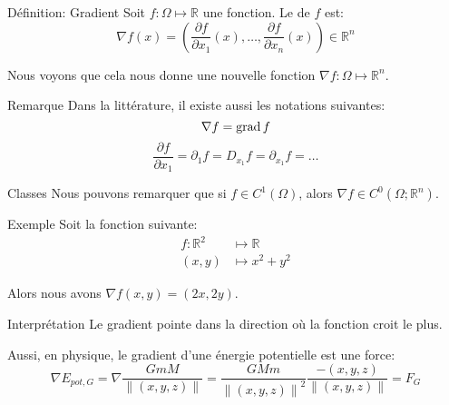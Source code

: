\documentclass[a4paper]{article}
\begin{document}
\begin{parag}{Définition: Gradient}
    Soit $f: \Omega \mapsto \mathbb{R}$ une fonction. Le  de $f$ est: 
    \[\nabla f\left(x\right) = \left(\frac{\partial f}{\partial x_1} \left(x\right), \ldots, \frac{\partial f}{\partial x_n} \left(x\right)\right) \in \mathbb{R}^n\]

    Nous voyons que cela nous donne une nouvelle fonction $\nabla f : \Omega \mapsto \mathbb{R}^n$.

    \begin{subparag}{Remarque}
        Dans la littérature, il existe aussi les notations suivantes: 
        \[\nabla f = \operatorname{grad} f\] 
        \[\frac{\partial f}{\partial x_1} = \partial_1 f = D_{x_1} f = \partial_{x_1} f = \ldots\]
    \end{subparag}

    \begin{subparag}{Classes}
        Nous pouvons remarquer que si $f \in C^1\left(\Omega\right)$, alors $\nabla f \in C^0\left(\Omega; \mathbb{R}^n\right)$.
    \end{subparag}

    \begin{subparag}{Exemple}
        Soit la fonction suivante: 
        \[\begin{split}
        f: \mathbb{R}^2 &\longmapsto \mathbb{R} \\
        \left(x, y\right) &\longmapsto x^2 + y^2
        \end{split}\]
        
        Alors nous avons $\nabla f\left(x, y\right) = \left(2x, 2y\right)$.
    \end{subparag}

    \begin{subparag}{Interprétation}
        Le gradient pointe dans la direction où la fonction croit le plus. 

        Aussi, en physique, le gradient d'une énergie potentielle est une force: 
        \[\nabla E_{pot, G} = \nabla \frac{G m M}{\left\|\left(x, y, z\right)\right\|} = \frac{G M m}{\left\|\left(x, y, z\right)\right\|^2} \frac{-\left(x, y, z\right)}{\left\|\left(x, y, z\right)\right\|} = F_G\]
    \end{subparag}
    
\end{parag}
\end{document}
